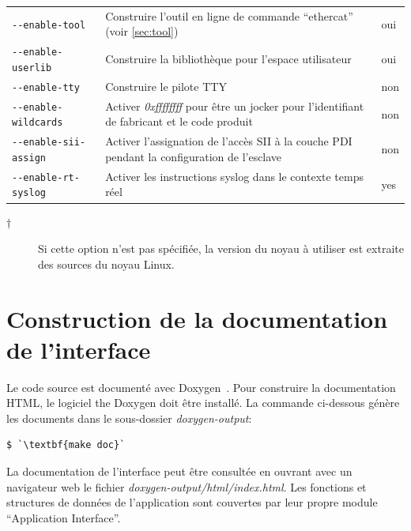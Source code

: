 \documentclass[a4paper,12pt,BCOR6mm,bibtotoc,idxtotoc]{scrbook}
\begin{document}
\begin{longtable}{l|p{}|l}
\lstinline+--enable-tool+ & Construire l'outil en ligne de commande
``ethercat'' (voir \autoref{sec:tool}) & oui\\

\lstinline+--enable-userlib+ & Construire la biblioth\`eque pour
l'espace utilisateur & oui\\

\lstinline+--enable-tty+ & Construire le pilote TTY & non\\

\lstinline+--enable-wildcards+ & Activer \textit{0xffffffff} pour \^etre
un jocker pour l'identifiant de fabricant et le code produit & non\\

\lstinline+--enable-sii-assign+ & Activer l'assignation de l'acc\`es SII
\`a la couche PDI pendant la configuration de l'esclave & non\\

\lstinline+--enable-rt-syslog+ & Activer les instructions syslog dans
le contexte temps r\'eel & yes\\

\hline

\end{longtable}

\begin{description}

\item[$\dagger$] Si cette option n'est pas sp\'ecifi\'ee, la version du noyau
  \`a utiliser est extraite des sources du noyau Linux.

\end{description}

\section{Construction de la documentation de l'interface}
\label{sec:gendoc}

Le code source est document\'e avec
Doxygen~\cite{doxygen}. Pour construire la documentation HTML,
le logiciel the Doxygen doit \^etre install\'e. La commande ci-dessous
g\'en\`ere les documents dans le sous-dossier \textit{doxygen-output}:

\begin{lstlisting}
$ `\textbf{make doc}`
\end{lstlisting}

La documentation de l'interface peut \^etre consult\'ee en ouvrant avec
un navigateur web le fichier \textit{doxygen-output/html/index.html}.
Les fonctions et structures de donn\'ees de l'application sont couvertes
par leur propre module ``Application Interface''.
\end{document}
